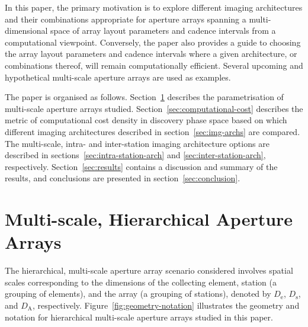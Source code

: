 \documentclass[
  journal=pasa,
  manuscript=article-type,
  year=2020,
  volume=37,
]{cup-journal}
\begin{document}
In this paper, the primary motivation is to explore different imaging architectures and their combinations appropriate for aperture arrays spanning a multi-dimensional space of array layout parameters and cadence intervals from a computational viewpoint. Conversely, the paper also provides a guide to choosing the array layout parameters and cadence intervals where a given architecture, or combinations thereof, will remain computationally efficient. Several upcoming and hypothetical multi-scale aperture arrays are used as examples. 

The paper is organised as follows.
Section~\ref{sec:multi-scale-arrays} describes the parametrisation of multi-scale aperture arrays studied. Section~\ref{sec:computational-cost} describes the metric of computational cost density in discovery phase space based on which different imaging architectures described in section~\ref{sec:img-archs} are compared. The multi-scale, intra- and inter-station imaging architecture options are described in sections~\ref{sec:intra-station-arch} and \ref{sec:inter-station-arch}, respectively. Section~\ref{sec:results} contains a discussion and summary of the results, and conclusions are presented in section~\ref{sec:conclusion}. 

\section{Multi-scale, Hierarchical Aperture Arrays} \label{sec:multi-scale-arrays}

The hierarchical, multi-scale aperture array scenario considered involves spatial scales corresponding to the dimensions of the collecting element, station (a grouping of elements), and the array (a grouping of stations), denoted by $D_\textrm{e}$, $D_\textrm{s}$, and $D_\textrm{A}$, respectively. Figure~\ref{fig:geometry-notation} illustrates the geometry and notation for hierarchical multi-scale aperture arrays studied in this paper.
\end{document}
